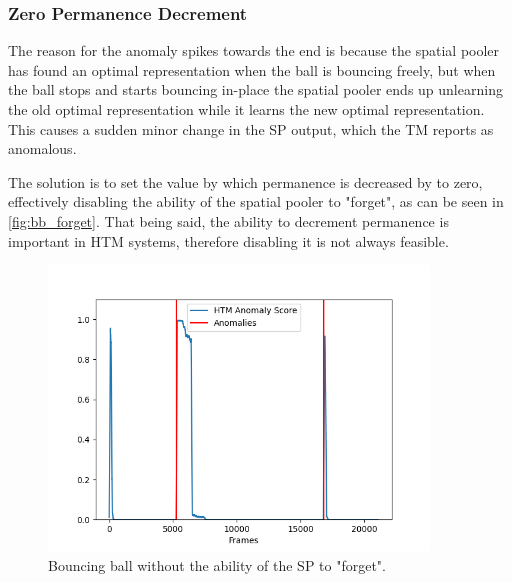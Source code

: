 \subsubsection{Zero Permanence Decrement}
The reason for the anomaly spikes towards the end is because the spatial pooler has found an optimal representation when the ball is bouncing freely, but when the ball stops and starts bouncing in-place the spatial pooler ends up unlearning the old optimal representation while it learns the new optimal representation. This causes a sudden minor change in the SP output, which the TM reports as anomalous.
\par
The solution is to set the value by which permanence is decreased by to zero, effectively disabling the ability of the spatial pooler to "forget", as can be seen in \autoref{fig:bb_forget}. That being said, the ability to decrement permanence is important in HTM systems, therefore disabling it is not always feasible.
\begin{figure}[H]
    \centering
    \includegraphics[width=0.9\textwidth]{resources/experiments/bouncing_ball/bb_anoms_unforgetting.png}
    \caption{Bouncing ball without the ability of the SP to "forget".}
    \label{fig:bb_forget}
\end{figure}
